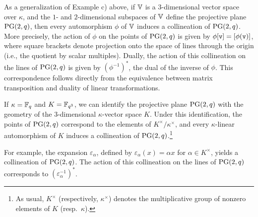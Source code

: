 \begin{rem}\label{rem:Fq3/Fq-projective-plane}
    As a generalization of Example c) above, if $\V$ is a $3$-dimensional vector space over $\kappa$, and the $1$- and $2$-dimensional subspaces of $\V$ define the projective plane $\PG(2,q)$, then every automorphism $\phi$ of $\V$ induces a collineation of $\PG(2,q)$. More precisely, the action of $\phi$ on the points of $\PG(2,q)$ is given by $\phi[\vect v] = [\phi(\vect v)]$, where square brackets denote projection onto the space of lines through the origin (i.e., the quotient by scalar multiples). Dually, the action of this collineation on the lines of $\PG(2,q)$ is given by $(\phi^{-1})^*$, the dual of the inverse of $\phi$. This correspondence follows directly from the equivalence between matrix transposition and duality of linear transformations.

    If $\kappa = \Fq$ and $K = \Fq[q^3]$, we can identify the projective plane $\PG(2,q)$ with the geometry of the $3$-dimensional $\kappa$-vector space $K$. Under this identification, the points of $\PG(2,q)$ correspond to the elements of $K^\times/\kappa^\times$, and every $\kappa$-linear automorphism of $K$ induces a collineation of $\PG(2,q)$.\footnote{As usual, $K^\times$ (respectively, $\kappa^\times$) denotes the multiplicative group of nonzero elements of $K$ (resp.\ $\kappa$).}
    
    For example, the expansion $\varepsilon_\alpha$, defined by $\varepsilon_\alpha(x)=\alpha x$ for $\alpha \in K^\times$, yields a collineation of $\PG(2,q)$. The action of this collineation on the lines of $\PG(2,q)$ corresponds to $(\varepsilon_\alpha^{-1})^*$.


\end{rem}
